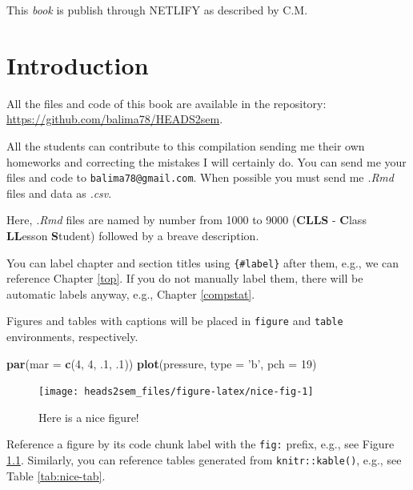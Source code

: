 \documentclass[]{book}
\newenvironment{Shaded}{\begin{snugshade}}{\end{snugshade}}
\newcommand{\DataTypeTok}[1]{\textcolor[rgb]{0.13,0.29,0.53}{#1}}
\newcommand{\DecValTok}[1]{\textcolor[rgb]{0.00,0.00,0.81}{#1}}
\newcommand{\FloatTok}[1]{\textcolor[rgb]{0.00,0.00,0.81}{#1}}
\newcommand{\KeywordTok}[1]{\textcolor[rgb]{0.13,0.29,0.53}{\textbf{#1}}}
\newcommand{\NormalTok}[1]{#1}
\newcommand{\StringTok}[1]{\textcolor[rgb]{0.31,0.60,0.02}{#1}}
\begin{document}
This \emph{book} is publish through NETLIFY as described by C.M.

\hypertarget{intro}{%
\chapter{Introduction}\label{intro}}

All the files and code of this book are available in the repository: \url{https://github.com/balima78/HEADS2sem}.

All the students can contribute to this compilation sending me their own homeworks and correcting the mistakes I will certainly do. You can send me your files and code to \texttt{balima78@gmail.com}. When possible you must send me \emph{.Rmd} files and data as \emph{.csv}.

Here, \emph{.Rmd} files are named by number from 1000 to 9000 (\textbf{CLLS} - \textbf{C}lass \textbf{LL}esson \textbf{S}tudent) followed by a breave description.

You can label chapter and section titles using \texttt{\{\#label\}} after them, e.g., we can reference Chapter \ref{top}. If you do not manually label them, there will be automatic labels anyway, e.g., Chapter \ref{compstat}.

Figures and tables with captions will be placed in \texttt{figure} and \texttt{table} environments, respectively.

\begin{Shaded}
\begin{Highlighting}[]
\KeywordTok{par}\NormalTok{(}\DataTypeTok{mar =} \KeywordTok{c}\NormalTok{(}\DecValTok{4}\NormalTok{, }\DecValTok{4}\NormalTok{, }\FloatTok{.1}\NormalTok{, }\FloatTok{.1}\NormalTok{))}
\KeywordTok{plot}\NormalTok{(pressure, }\DataTypeTok{type =} \StringTok{'b'}\NormalTok{, }\DataTypeTok{pch =} \DecValTok{19}\NormalTok{)}
\end{Highlighting}
\end{Shaded}

\begin{figure}

{\centering \texttt{[image: heads2sem\_files/figure-latex/nice-fig-1]} 

}

\caption{Here is a nice figure!}\label{fig:nice-fig}
\end{figure}

Reference a figure by its code chunk label with the \texttt{fig:} prefix, e.g., see Figure \ref{fig:nice-fig}. Similarly, you can reference tables generated from \texttt{knitr::kable()}, e.g., see Table \ref{tab:nice-tab}.
\end{document}
